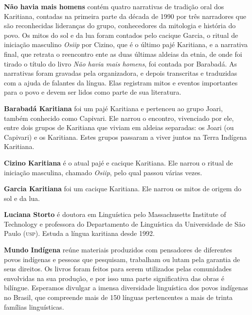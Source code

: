 \textbf{Não havia mais homens} contém quatro narrativas de tradição oral dos Karitiana, contadas na primeira parte da década de 1990 por três narradores que são reconhecidas lideranças do grupo, conhecedores da mitologia e história do povo. Os mitos do sol e da lua foram contados pelo cacique Garcia, o ritual de iniciação masculino \textit{Osiip} por Cizino, que é o último pajé Karitiana, e a narrativa final, que retrata o reencontro ente as duas últimas aldeias da etnia, de onde foi tirado o título do livro \textit{Não havia mais homens}, foi contada por Barabadá. As narrativas foram gravadas pela organizadora, e depois transcritas e traduzidas com a ajuda de falantes da língua. Elas registram mitos e eventos importantes para o povo e devem ser lidos como parte de sua literatura. 

\textbf{Barabadá Karitiana} foi um pajé Karitiana e pertenceu ao grupo Joari, também conhecido como Capivari. Ele narrou o encontro, vivenciado por
 ele, entre dois grupos de Karitiana que viviam em aldeias separadas: os
 Joari (ou Capivari) e os Karitiana. Estes grupos passaram a viver juntos
 na Terra Indígena Karitiana.

 \textbf{Cizino Karitiana} é o atual pajé e cacique Karitiana. Ele narrou o ritual
 de iniciação masculina, chamado \textit{Osiip}, pelo qual passou várias
 vezes.

 \textbf{Garcia Karitiana} foi um cacique Karitiana. Ele narrou os mitos de origem
 do sol e da lua.

\textbf{Luciana Storto} é doutora em Linguística pelo Massachusetts Institute of
Technology e professora do Departamento de Linguística da Universidade
de São Paulo (\textsc{usp}). Estuda a língua karitiana desde 1992.

\textbf{Mundo Indígena} reúne materiais produzidos com pensadores de diferentes povos indígenas e pessoas que pesquisam, trabalham ou lutam pela garantia de seus direitos. Os livros foram feitos para serem utilizados pelas comunidades envolvidas na sua produção, e por isso uma parte significativa das obras é bilíngue. Esperamos divulgar a imensa diversidade linguística dos povos indígenas no Brasil, que compreende mais de 150 línguas pertencentes a mais de trinta famílias linguísticas.

